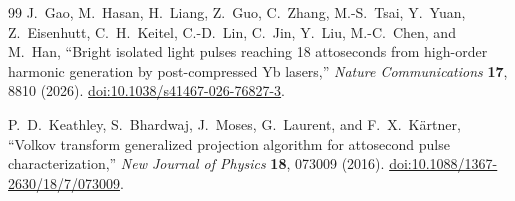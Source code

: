 \begin{thebibliography}{99}
J.~Gao, M.~Hasan, H.~Liang, Z.~Guo, C.~Zhang, M.-S.~Tsai,
Y.~Yuan, Z.~Eisenhutt, C.~H.~Keitel, C.-D.~Lin, C.~Jin,
Y.~Liu, M.-C.~Chen, and M.~Han,
``Bright isolated light pulses reaching 18 attoseconds from high-order harmonic generation by post-compressed Yb lasers,''
\emph{Nature Communications} \textbf{17}, 8810 (2026).
\href{https://doi.org/10.1038/s41467-026-76827-3}{doi:10.1038/s41467-026-76827-3}.

P.~D.~Keathley, S.~Bhardwaj, J.~Moses, G.~Laurent, and F.~X.~K\"artner,
``Volkov transform generalized projection algorithm for attosecond pulse characterization,''
\emph{New Journal of Physics} \textbf{18}, 073009 (2016).
\href{https://doi.org/10.1088/1367-2630/18/7/073009}{doi:10.1088/1367-2630/18/7/073009}.
\end{thebibliography}
